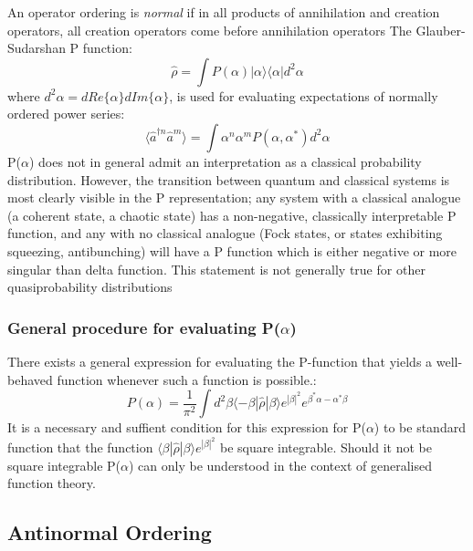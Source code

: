 \documentclass[reqno]{amsart}
\newcommand{\dens}{\hat{\rho}}
\newcommand{\ket}[1]{| #1 \rangle}
\newcommand{\bra}[1]{\langle #1 |}
\begin{document}
An operator ordering is \emph{normal} if in all products of annihilation and creation operators, all creation operators come before annihilation operators \autocite{Mandl2010} The Glauber-Sudarshan P function\autocite{Cahill1969}:
\begin{equation}
	\dens = \int P(\alpha) | \alpha \rangle \langle \alpha | d^2 \alpha
	\end{equation}
where $d^2 \alpha = dRe\{\alpha\}dIm\{\alpha\}$, is used for evaluating expectations of normally ordered power series:
\begin{equation}
	\langle \hat{a}^{\dagger n} \hat{a}^{m}  \rangle = \int \alpha^n \alpha^m P (\alpha, \alpha^*) d^2 \alpha
\end{equation}
P($\alpha$) does not in general admit an interpretation as a classical probability distribution. However, the transition between quantum and classical systems is most clearly visible in the P representation; any system with a classical analogue (a coherent state, a chaotic state) has a non-negative, classically interpretable P function, and any with no classical analogue (Fock states, or states exhibiting squeezing, antibunching) will have a P function which is either negative or more singular than delta function. This statement is not generally true for other quasiprobability distributions\autocite{Mandel1995}

\subsubsection{General procedure for evaluating P($\alpha$)}
\label{mehta}

There exists a general expression for evaluating the P-function that yields a well-behaved function whenever such a function is possible.\autocite{Mehta1967}:
\begin{equation}
	P(\alpha) = \frac{1}{\pi^2} \int d^2 \beta \bra{-\beta} \dens \ket{\beta} e^{|\beta|^2} e^{\beta^* \alpha -\alpha^* \beta}
\end{equation}
It is a necessary and suffient condition for this expression for P($\alpha$) to be standard function that the function $ \bra{\beta} \dens \ket{\beta} e^{|\beta|^2} $ be square integrable. Should it not be square integrable P($\alpha$) can only be understood in the context of generalised function theory.

\subsection{Antinormal Ordering}
\end{document}
